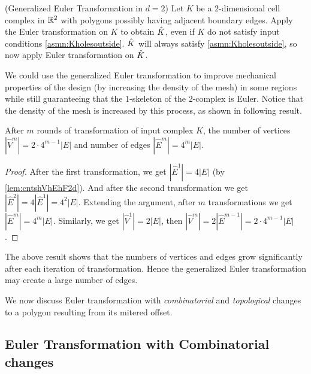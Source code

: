 \begin{defn}
	\label{def:genET}
	(Generalized Euler Transformation in $d=2$)
	Let $K$ be a $2$-dimensional cell complex in ${\mathbb R}^2$ with polygons possibly having adjacent boundary edges.
	Apply the Euler transformation on $K$ to obtain $\hat{K}$, even if $K$ do not satisfy input conditions \ref{asmn:Kholesoutside}.
	$\hat{K}$ will always satisfy \cref{asmn:Kholesoutside}, so now apply Euler transformation on $\hat{K}$.
\end{defn}
We could use the generalized Euler transformation to improve mechanical properties of the design (by increasing the density of the mesh) in some regions while still guaranteeing that the $1$-skeleton of the $2$-complex is Euler.
Notice that the density of the mesh is increased by this process, as shown in following result. 
\begin{lem}
  \label{lem:trgrrate} 
  After $m$ rounds of transformation of input complex $K$, the number of vertices $|\hat{V}^m| = 2\cdot 4^{m-1}|E|$ and number of edges $|\hat{E}^m|=4^m|E|$.	
\end{lem}
\begin{proof}
  After the first transformation, we get $|\hat{E}^{1}| = 4 |E|$ (by \cref{lem:cntshVhEhF2d}).
  And after the second transformation we get $|\hat{E}^2| = 4 |\hat{E}^1| = 4^2|E|$.
  Extending the argument, after $m$ transformations we get $|\hat{E}^m| = 4^m |E|$.
  Similarly, we get $|\hat{V}^1| = 2 |E|$, then $|\hat{V}^m| = 2 |\hat{E}^{m-1}| = 2\cdot4^{m-1}|E|$.     	
\end{proof}
The above result shows that the numbers of vertices and edges grow significantly after each iteration of transformation.
Hence the generalized Euler transformation may create a large number of edges.

We now discuss Euler transformation with \emph{combinatorial} and \emph{topological} changes to a polygon resulting from its mitered offset. 

\subsection{Euler Transformation with Combinatorial changes}\label{sec:eulertransformwithcombin}

